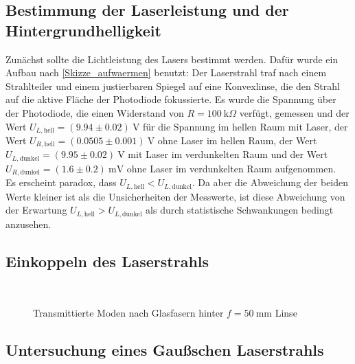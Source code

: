 \documentclass[11pt,a4paper,oneside]{scrartcl}
\begin{document}
\subsection{Bestimmung der Laserleistung und der Hintergrundhelligkeit}
Zunächst sollte die Lichtleistung des Lasers bestimmt werden. Dafür wurde ein Aufbau nach \ref{Skizze_aufwaermen} benutzt: Der Laserstrahl traf nach einem Strahlteiler und einem justierbaren Spiegel auf eine Konvexlinse, die den Strahl auf die aktive Fläche der Photodiode fokussierte. Es wurde die Spannung über der Photodiode, die einen Widerstand von $R=100\ \mathrm{k}\Omega$ verfügt, gemessen und der Wert $U_{L,\mathrm{hell}}=(9.94\pm 0.02)\ \mathrm V$ für die Spannung im hellen Raum mit Laser, der Wert $U_{R,\mathrm{hell}}=(0.0505\pm 0.001)\ \mathrm V$ ohne Laser im hellen Raum, der Wert  $U_{L,\mathrm{dunkel}}=(9.95\pm 0.02)\ \mathrm V$ mit Laser im verdunkelten Raum und der Wert  $U_{R,\mathrm{dunkel}}=(1.6\pm 0.2)\ \mathrm{mV}$ ohne Laser im verdunkelten Raum aufgenommen.\\
Es erscheint paradox, dass $U_{L,\mathrm{hell}}<U_{L,\mathrm{dunkel}}$. Da aber die Abweichung der beiden Werte kleiner ist als die Unsicherheiten der Messwerte, ist diese Abweichung von der Erwartung $U_{L,\mathrm{hell}}>U_{L,\mathrm{dunkel}}$ als durch statistische Schwankungen bedingt anzusehen.
 
\subsection{Einkoppeln des Laserstrahls}
\begin{figure}[H]
\setcounter{imEnv}{1}
    \centering
  \\
   \caption{Transmittierte Moden nach Glasfasern hinter $f=50\ \mathrm{mm}$ Linse}
    \label{FotostreckeGlasfasern}
\end{figure}
\subsection{Untersuchung eines Gaußschen Laserstrahls}
\end{document}
